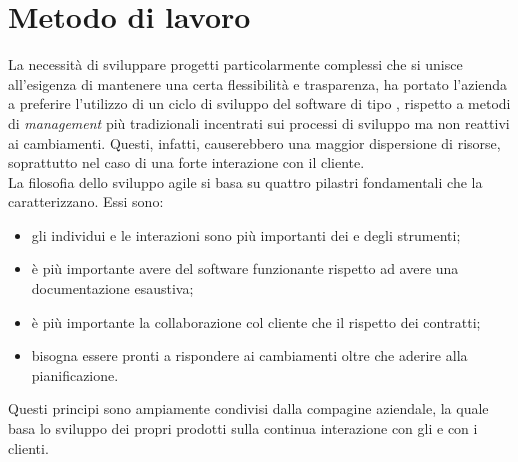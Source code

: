 \section{Metodo di lavoro}
La necessità di sviluppare progetti particolarmente complessi che si unisce all'esigenza di mantenere una certa flessibilità e trasparenza, ha portato l'azienda a preferire l'utilizzo di un ciclo di sviluppo del software di tipo , rispetto a metodi di \emph{management} più tradizionali incentrati sui processi di sviluppo ma non reattivi ai cambiamenti. Questi, infatti, causerebbero una maggior dispersione di risorse, soprattutto nel caso di una forte interazione con il cliente.\\
La filosofia dello sviluppo agile si basa su quattro pilastri fondamentali che la caratterizzano.  \newpage
Essi sono:
\begin{itemize}
	\item gli individui e le interazioni sono più importanti dei  e degli strumenti;
	\item è più importante avere del software funzionante rispetto ad avere una documentazione esaustiva;
	\item è più importante la collaborazione col cliente che il rispetto dei contratti;
	\item bisogna essere pronti a rispondere ai cambiamenti oltre che aderire alla pianificazione.
\end{itemize}
Questi principi sono ampiamente condivisi dalla compagine aziendale, la quale basa lo sviluppo dei propri prodotti sulla continua interazione con gli  e con i clienti.

